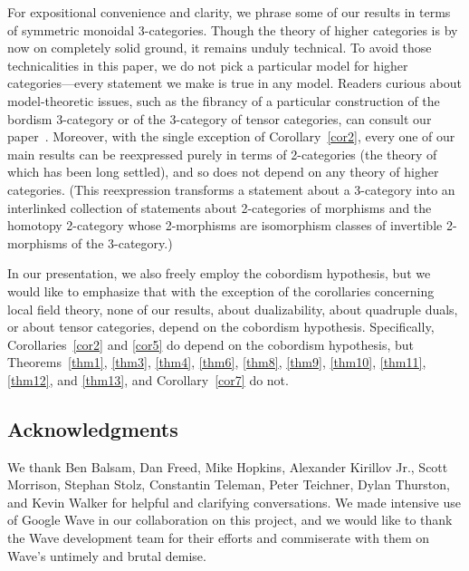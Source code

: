 \documentclass{amsart}
\begin{document}
\begin{remarkohc*}
For expositional convenience and clarity, we phrase some of our results in terms of symmetric monoidal 3-categories.  Though the theory of higher categories is by now on completely solid ground, it remains unduly technical.  To avoid those technicalities in this paper, we do not pick a particular model for higher categories---every statement we make is true in any model.  Readers curious about model-theoretic issues, such as the fibrancy of a particular construction of the bordism 3-category or of the 3-category of tensor categories, can consult our paper~\cite{3TC}.  Moreover, with the single exception of Corollary~\ref{cor2}, every one of our main results can be reexpressed purely in terms of 2-categories (the theory of which has been long settled), and so does not depend on any theory of higher categories.  (This reexpression transforms a statement about a 3-category into an interlinked collection of statements about 2-categories of morphisms and the homotopy 2-category whose 2-morphisms are isomorphism classes of invertible 2-morphisms of the 3-category.)

In our presentation, we also freely employ the cobordism hypothesis, but we would like to emphasize that with the exception of the corollaries concerning local field theory, none of our results, about dualizability, about quadruple duals, or about tensor categories, depend on the cobordism hypothesis.  Specifically, Corollaries~\ref{cor2} and \ref{cor5} do depend on the cobordism hypothesis, but Theorems~\ref{thm1}, \ref{thm3}, \ref{thm4}, \ref{thm6}, \ref{thm8}, \ref{thm9}, \ref{thm10}, \ref{thm11}, \ref{thm12}, and \ref{thm13}, and Corollary~\ref{cor7} do not.
\end{remarkohc*}


\subsection*{Acknowledgments}

We thank Ben Balsam, Dan Freed, Mike Hopkins, Alexander Kirillov Jr., Scott Morrison, Stephan Stolz, Constantin Teleman, Peter Teichner, Dylan Thurston, and Kevin Walker for helpful and clarifying conversations.  We made intensive use of Google Wave in our collaboration on this project, and we would like to thank the Wave development team for their efforts and commiserate with them on Wave's untimely and brutal demise.
\end{document}
